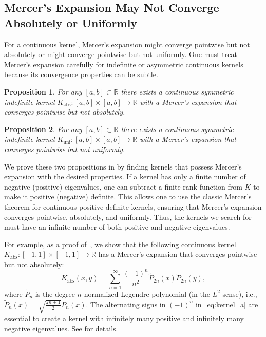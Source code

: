 \documentclass{article}
\newtheorem{proposition}{Proposition}
\begin{document}
\subsection{Mercer's Expansion May Not Converge Absolutely or Uniformly}\label{sec:absoluteuniformexample}
For a continuous kernel, Mercer's expansion might converge pointwise but not absolutely or might converge pointwise but not uniformly. One must treat Mercer's expansion carefully for indefinite or asymmetric continuous kernels because its convergence properties can be subtle. 

\begin{proposition}\label{prop:Kabsolute}
For any $[a, b]\subset \mathbb{R}$ there exists a continuous symmetric indefinite kernel $K_{\text{abs}}:[a,b]\times [a,b]\rightarrow \mathbb{R}$ with a Mercer's expansion that converges pointwise but not absolutely.   
\end{proposition}


\begin{proposition}\label{prop:Kuniform}
For any $[a, b]\subset \mathbb{R}$ there exists a continuous symmetric indefinite kernel $K_{\text{uni}}:[a,b]\times [a,b]\rightarrow \mathbb{R}$ with a Mercer's expansion that converges pointwise but not uniformly. 
\end{proposition}

We prove these two propositions in  by finding kernels that possess Mercer's expansion with the desired properties. If a kernel has only a finite number of negative (positive) eigenvalues, one can subtract a finite rank function from $K$ to make it positive (negative) definite. This allows one to use the classic Mercer's theorem for continuous positive definite kernels, ensuring that Mercer's expansion converges pointwise, absolutely, and uniformly. Thus, the kernels we search for must have an infinite number of both positive and negative eigenvalues.

For example, as a proof of~, we show that the following continuous kernel $K_{\text{abs}}:[-1, 1]\times [-1, 1]\to \mathbb{R}$ has a Mercer's expansion that converges pointwise but not absolutely:  
\begin{equation}\label{eq:kernel_a}
    K_{\text{abs}}(x, y) = \sum_{n=1}^\infty \frac{(-1)^n}{n^2}\tilde{P}_{2n}(x)\tilde{P}_{2n}(y),
\end{equation}
where $\tilde{P}_n$ is the degree $n$ normalized Legendre polynomial (in the $L^2$ sense), i.e., $\tilde{P}_n(x) = \sqrt{\frac{2n+1}{2}}P_n(x)$. The alternating signs in $(-1)^n$ in~\cref{eq:kernel_a} are essential to create a kernel with infinitely many positive and infinitely many negative eigenvalues. See  for details. 
\end{document}
